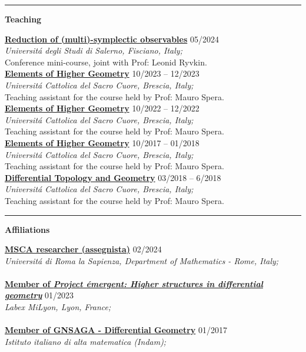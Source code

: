 \documentclass[a4paper]{article}
\newcommand{\block}[1]{\hrule \vspace{0.2cm} \textbf{\Large #1} \vspace{0.2cm}}
\newcommand{\voice}[5]{\href{#4}{\textbf{#1}} \hfill #2 \\ \textit{#3} \\ {\small #5} \vspace{0.2cm} \\}
\begin{document}

	\block{Teaching}

	\voice{Reduction of (multi)-symplectic observables}
		{05/2024}
		{Universit\'a degli Studi di Salerno, Fisciano, Italy;}
		{https://www.antoniomiti.it/teaching/Obs-Constraint-2024/}       
		{Conference mini-course, joint with Prof: Leonid Ryvkin.}
	\voice{Elements of Higher Geometry}
		{10/2023 -- 12/2023}
		{Universit\'a Cattolica del Sacro Cuore, Brescia, Italy;}
		{https://dmf.unicatt.it/miti/teaching/IstGeoSup-22-23/}       
		{Teaching assistant for the course held by Prof: Mauro Spera.}
	\voice{Elements of Higher Geometry}
		{10/2022 -- 12/2022}
		{Universit\'a Cattolica del Sacro Cuore, Brescia, Italy;}
		{https://dmf.unicatt.it/miti/teaching/IstGeoSup-22-23/}       
		{Teaching assistant for the course held by Prof: Mauro Spera.}
	\voice{Elements of Higher Geometry}
		{10/2017 -- 01/2018}
		{Universit\'a Cattolica del Sacro Cuore, Brescia, Italy;}
		{http://docenti.unicatt.it/web/html/index.html\#/programmi/BS/2D9B/75017/2017/21065/MIH341/ita}       
		{Teaching assistant for the course held by Prof: Mauro Spera.}
	\voice{Differential Topology and Geometry}
		{03/2018 -- 6/2018}
		{Universit\'a Cattolica del Sacro Cuore, Brescia, Italy;}
		{http://docenti.unicatt.it/web/html/index.html\#/programmi/BS/2D8B/75017/2017/21065/MGH344/ita}       
		{Teaching assistant for the course held by Prof: Mauro Spera.}



	\block{Affiliations}

	\voice{MSCA researcher (assegnista)}
		{02/2024}
		{Universit\'a di Roma la Sapienza, Department of Mathematics - Rome, Italy;}
		{https://www.mat.uniroma1.it/persone/miti}       
		{\vspace{-0.5cm}}
	\voice{Member of \emph{Project \'emergent: Higher structures in differential geometry}}
		{01/2023}
		{Labex MiLyon, Lyon, France;}
		{https://www.dropbox.com/s/36kh0vre45r38b2/2301-MiLyon-HigherGeometry.pdf?dl=0}       
		{\vspace{-0.5cm}}
	\voice{Member of GNSAGA - Differential Geometry}
		{01/2017}
		{Istituto italiano di alta matematica (Indam);}
		{https://web.archive.org/web/20170924125645/http://www.altamatematica.it/gnsaga/node/23}       
		{\vspace{-0.5cm}}
\end{document}
